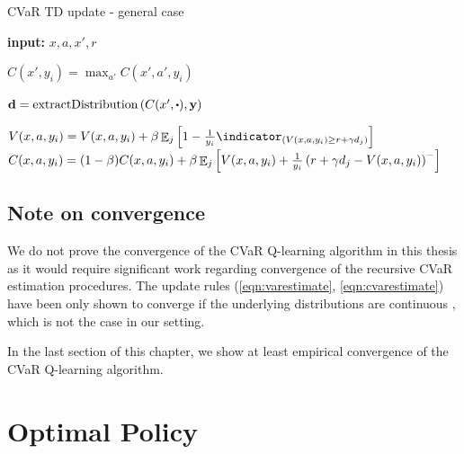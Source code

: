 \begin{algorithm}
\caption{CVaR TD update - general case}
\begin{algorithmic}\label{alg:cvartdg}

    \STATE \textbf{input:} $x, a, x', r$
    
	\STATE $C(x', y_i) = \max_{a'} C(x', a', y_i)$ \label{alg:cvartdg:1}
	\ENDFOR
	
	\STATE $\mathbf{d}= \text{extractDistribution}\bround{C(x', \bigcdot), \mathbf{y}}$ \label{alg:cvartdg:2} \label{alg:cvartd:2}

	\STATE $V(x, a, y_i) = V(x, a, y_i) + \beta \expect_j\bsquare{1 - \frac{1}{y_i}\indicator_{(V(x, a, y_i) \ge r+\gamma d_j)}}$  \label{alg:cvartd:4}
	\STATE $C(x, a, y_i) = (1-\beta)C(x, a, y_i) + \beta\mathop{\mathbb{E}}_j\left[ {V(x, a, y_i) + \frac{1}{y_i}\left( {r+\gamma d_j - V(x, a, y_i)} \right)^-} \right]$\label{alg:cvartdg:5}
	\ENDFOR
\end{algorithmic}
\end{algorithm}

\subsection{Note on convergence}
We do not prove the convergence of the CVaR Q-learning algorithm in this thesis as it would require significant work regarding convergence of the recursive CVaR estimation procedures. The update rules (\ref{eqn:varestimate}, \ref{eqn:cvarestimate})  have been only shown to converge if the underlying distributions are continuous \citep{bardou2009recursive}, which is not the case in our setting.


In the last section of this chapter, we show at least empirical convergence of the CVaR Q-learning algorithm.



\section{Optimal Policy}\label{sec:qpolicy}

